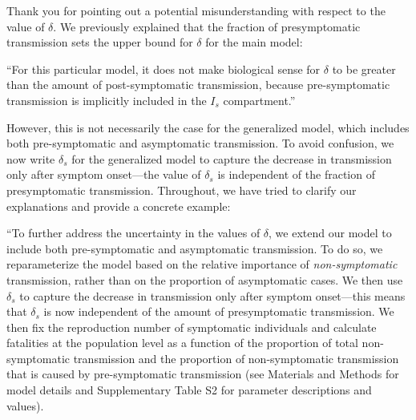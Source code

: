 \documentclass[12pt]{article}
\begin{document}
Thank you for pointing out a potential misunderstanding with respect to the value of $\delta$.
We previously explained that the fraction of presymptomatic transmission sets the upper bound for $\delta$ for the main model:

``For this particular model, it does not make biological sense for $\delta$ to be greater than the amount of post-symptomatic transmission, because pre-symptomatic transmission is implicitly included in the $I_s$ compartment.''

However, this is not necessarily the case for the generalized model, which includes both pre-symptomatic and asymptomatic transmission. 
To avoid confusion, we now write $\delta_s$ for the generalized model to capture the decrease in transmission only after symptom onset---the value of $\delta_s$ is independent of the fraction of presymptomatic transmission.
Throughout, we have tried to clarify our explanations and provide a concrete example:

``To further address the uncertainty in the values of $\delta$, we extend our model to include both pre-symptomatic and asymptomatic transmission.
To do so, we reparameterize the model based on the relative importance of \textit{non-symptomatic} transmission, rather than on the proportion of asymptomatic cases.
We then use $\delta_s$ to capture the decrease in transmission only after symptom onset---this means that $\delta_s$ is now independent of the amount of presymptomatic transmission.
We then fix the reproduction number of symptomatic individuals and calculate fatalities at the population level as a function of the proportion of total non-symptomatic transmission and the proportion of non-symptomatic transmission that is caused by pre-symptomatic transmission (see Materials and Methods for model details and Supplementary Table S2 for parameter descriptions and values).
\end{document}
